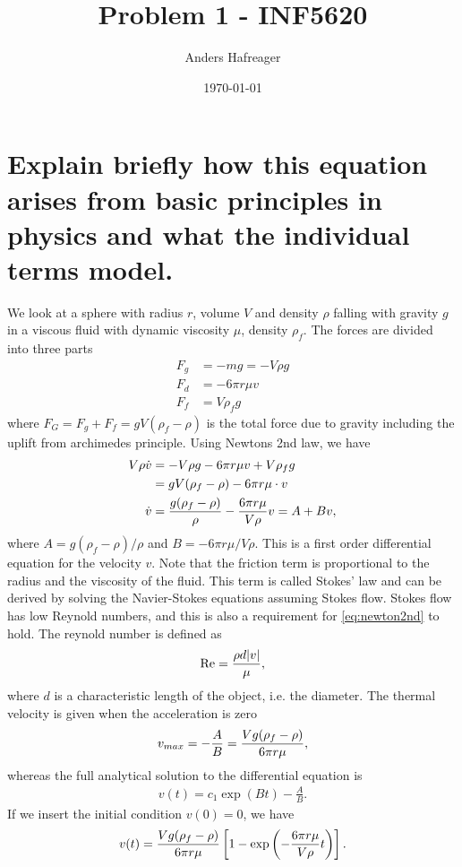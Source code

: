 \documentclass[a4paper,10pt]{article}
\title{Problem 1 - INF5620}
\date{\today}
\author{Anders Hafreager}
\renewcommand{\(}{\left(}
\renewcommand{\)}{\right)}
\begin{document}
\section{Explain briefly how this equation arises from basic principles in physics and what the individual terms model.}
We look at a sphere with radius $r$, volume $V$ and density $\rho$ falling with gravity $g$ in a viscous fluid with dynamic viscosity $\mu$, density $\rho_f$. The forces are divided into three parts
\begin{align*}
  F_g &= -mg = -V\rho g\\
  F_d &= -6\pi r\mu v\\
  F_f &= V\rho_f g
\end{align*}
where $F_G = F_g + F_f = gV(\rho_f - \rho)$ is the total force due to gravity including the uplift from archimedes principle. Using Newtons 2nd law, we have
\begin{align}
  \nonumber
  V\rho \dot v &= -V\rho g -6\pi r\mu v + V\rho_f g\\
  \nonumber
  &= gV(\rho_f - \rho) -6\pi r\mu \cdot v\\
  \label{eq:newton2nd}
  \dot v &= {g(\rho_f - \rho) \over \rho} -{6\pi r\mu \over V\rho }v = A + Bv,
\end{align}
where $A=g(\rho_f - \rho)/\rho$ and $B=-6\pi r\mu /V\rho$. This is a first order differential equation for the velocity $v$. Note that the friction term is proportional to the radius and the viscosity of the fluid. This term is called Stokes' law and can be derived by solving the Navier-Stokes equations assuming Stokes flow. Stokes flow has low Reynold numbers, and this is also a requirement for \eqref{eq:newton2nd} to hold. The reynold number is defined as
\begin{align}
  \label{eq:reynold}
  \text{Re} = {\rho d|v| \over \mu},
 \end{align}
where $d$ is a characteristic length of the object, i.e. the diameter. The thermal velocity is given when the acceleration is zero
\begin{align*}
  v_{max} = -{A \over B} = {Vg(\rho_f - \rho) \over {6\pi r\mu}},
\end{align*}
whereas the full analytical solution to the differential equation is
\begin{align*}
  v(t) = c_1\exp(Bt) - \frac{A}{B}.
\end{align*}
If we insert the initial condition $v(0)=0$, we have
\begin{align*}
  v(t) = {Vg(\rho_f - \rho) \over {6\pi r\mu}}\left[1 - \exp\left(-\frac{6\pi r\mu}{V\rho}t\right)\right].
\end{align*}
\end{document}
